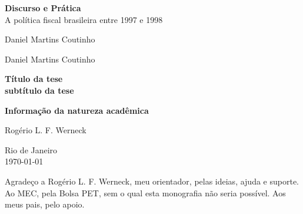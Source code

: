 \documentclass{article}
\renewcommand{\baselinestretch}{1.5}
\begin{document}
\thispagestyle{empty}
\phantom{----}
\vspace{4cm}
\begin{center}

\textbf{\LARGE{Discurso e Prática}}\\
\Large{A política fiscal brasileira entre 1997 e 1998}

\vspace{3cm}

\Large{Daniel Martins Coutinho}

\end{center}

\newpage
\thispagestyle{empty}

\begin{flushright}


\Large \textsf{Daniel Martins Coutinho}\\

\bigskip
\bigskip
\bigskip

\renewcommand{\baselinestretch}{1}

\Large \textsf{\textbf {Título da tese}}\\
\large \textsf{\textbf {subtítulo da tese}}\\

\bigskip
\smallskip

\large \textsf{\textbf {Informação da natureza acadêmica}}\\

\renewcommand{\baselinestretch}{1.5}

\bigskip
\smallskip

\large \textsf{Rogério L. F. Werneck}\\

\bigskip
\bigskip

\large \textsf{Rio de Janeiro}\\
\large \textsf{\today}\\

\end{flushright}

\newpage
\thispagestyle{empty}

\begin{center}

Agradeço a Rogério L. F. Werneck, meu orientador, pelas ideias, ajuda e suporte.
Ao MEC, pela Bolsa PET, sem o qual esta monografia não seria possível. 
Aos meus pais, pelo apoio.

\end{center}
\end{document}

